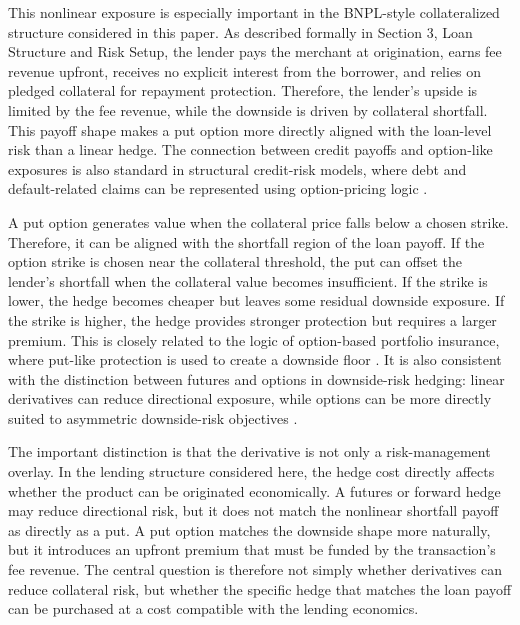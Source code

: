 \documentclass[11pt]{article}
\begin{document}
This nonlinear exposure is especially important in the BNPL-style collateralized structure considered in this paper. As described formally in Section 3, Loan Structure and Risk Setup, the lender pays the merchant at origination, earns fee revenue upfront, receives no explicit interest from the borrower, and relies on pledged collateral for repayment protection. Therefore, the lender’s upside is limited by the fee revenue, while the downside is driven by collateral shortfall. This payoff shape makes a put option more directly aligned with the loan-level risk than a linear hedge. The connection between credit payoffs and option-like exposures is also standard in structural credit-risk models, where debt and default-related claims can be represented using option-pricing logic \citep{black_scholes_1973_options, merton_1974_debt}.

A put option generates value when the collateral price falls below a chosen strike. Therefore, it can be aligned with the shortfall region of the loan payoff. If the option strike is chosen near the collateral threshold, the put can offset the lender’s shortfall when the collateral value becomes insufficient. If the strike is lower, the hedge becomes cheaper but leaves some residual downside exposure. If the strike is higher, the hedge provides stronger protection but requires a larger premium. This is closely related to the logic of option-based portfolio insurance, where put-like protection is used to create a downside floor \citep{rubinstein_1985_portfolio_insurance}. It is also consistent with the distinction between futures and options in downside-risk hedging: linear derivatives can reduce directional exposure, while options can be more directly suited to asymmetric downside-risk objectives \citep{lien_tse_2001_downside}.

The important distinction is that the derivative is not only a risk-management overlay. In the lending structure considered here, the hedge cost directly affects whether the product can be originated economically. A futures or forward hedge may reduce directional risk, but it does not match the nonlinear shortfall payoff as directly as a put. A put option matches the downside shape more naturally, but it introduces an upfront premium that must be funded by the transaction’s fee revenue. The central question is therefore not simply whether derivatives can reduce collateral risk, but whether the specific hedge that matches the loan payoff can be purchased at a cost compatible with the lending economics.
\end{document}
